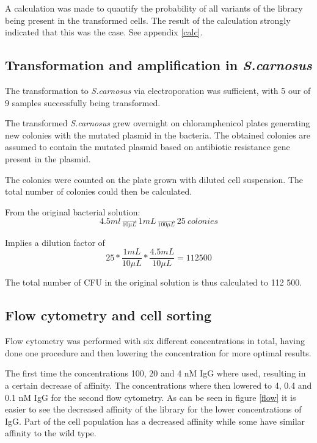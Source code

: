 \documentclass{article}
\begin{document}
\begin{multicols}{2}
	A calculation was made to quantify the probability of all variants of the library being present in the transformed cells. The result of the calculation strongly indicated that this was the case. See appendix \ref{calc}.
	
	\subsection{Transformation and amplification in \textit{S.carnosus}}
	The transformation to \textit{S.carnosus} via electroporation was sufficient, with 5 our of 9 samples successfully being transformed.
	
	The transformed \textit{S.carnosus} grew overnight on chloramphenicol plates generating new colonies with the mutated plasmid in the bacteria. The obtained colonies are assumed to contain the mutated plasmid based on antibiotic resistance gene present in the plasmid. 
	
	The colonies were counted on the plate grown with diluted cell suspension. The total number of colonies could then be calculated.
	
	From the original bacterial solution:
	\begin{equation}
		4.5 ml \ \overrightarrow{_{10 \mu L}} \ 1 mL \ \overrightarrow{_{100 \mu L}} \ 25 \ colonies
	\end{equation}
	
	Implies a dilution factor of
	\begin{equation}
		25*\frac{1 mL}{10 \mu L}*\frac{4.5 mL}{10 \mu L}=112500
	\end{equation}
	
	The total number of CFU in the original solution is thus calculated to 112 500.
	
	\subsection{Flow cytometry and cell sorting}
	
	Flow cytometry was performed with six different concentrations in total, having done one procedure and then lowering the concentration for more optimal results.
	
	The first time the concentrations 100, 20 and 4 nM IgG where used, resulting in a certain decrease of affinity. The concentrations where then lowered to 4, 0.4 and 0.1 nM IgG for the second flow cytometry. As can be seen in figure \ref{flow} it is easier to see the decreased affinity of the library for the lower concentrations of IgG. Part of the cell population has a decreased affinity while some have similar affinity to the wild type. 


\end{multicols}
\end{document}
